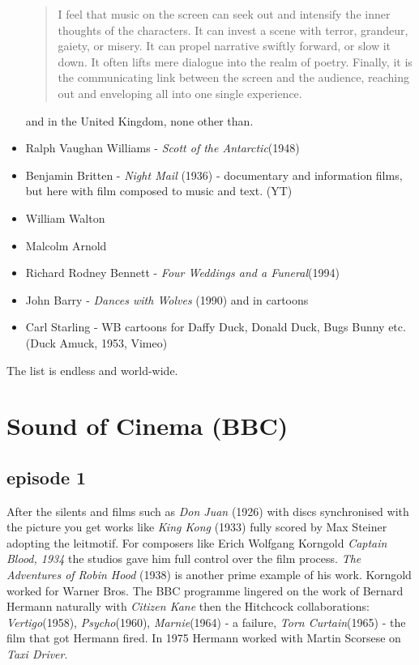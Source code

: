\begin{itemize}
\begin{quotation}
I feel that music on the screen can seek out and intensify the inner thoughts of the characters. It can invest a scene with terror, grandeur, gaiety, or misery. It can propel narrative swiftly forward, or slow it down. It often lifts mere dialogue into the realm of poetry. Finally, it is the communicating link between the screen and the audience, reaching out and enveloping all into one single experience.
\end{quotation}

and in the United Kingdom, none other than.

\item Ralph Vaughan Williams - \textit{Scott of the Antarctic}(1948)
\item Benjamin Britten - \textit{Night Mail} (1936) - documentary and information films, but here with film composed to music and text. (YT)
\item William Walton
\item Malcolm Arnold
\item Richard Rodney Bennett - \textit{Four Weddings and a Funeral}(1994)
\item John Barry - \textit{Dances with Wolves} (1990)
and in cartoons

\item Carl Starling - WB cartoons for Daffy Duck, Donald Duck, Bugs Bunny etc. (Duck Amuck, 1953,  Vimeo) 
\end{itemize}

The list is endless and world-wide. 

\section{Sound of Cinema (BBC)}
\subsection{episode 1}
After the silents and films such as \textit{Don Juan} (1926) with discs synchronised with the picture you get works like \textit{King Kong} (1933) fully scored by Max Steiner adopting the leitmotif. For composers like Erich Wolfgang Korngold \textit{Captain Blood, 1934} the studios gave him full control over the film process. \textit{The Adventures of Robin Hood} (1938) is another prime example of his work. Korngold worked for Warner Bros. 
The BBC programme lingered on the work of Bernard Hermann naturally with \textit{Citizen Kane} then the Hitchcock collaborations: \textit{Vertigo}(1958), \textit{Psycho}(1960), \textit{Marnie}(1964) - a failure, \textit{Torn Curtain}(1965) - the film that got Hermann fired. In 1975 Hermann worked with Martin Scorsese on \textit{Taxi Driver}.

